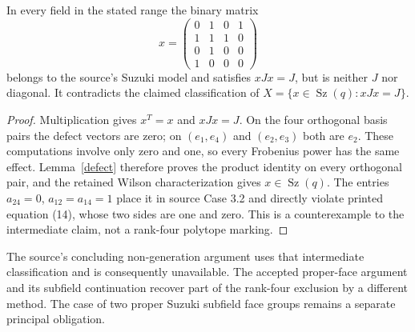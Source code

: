 \documentclass[11pt,a4paper]{article}
\begin{document}
\begin{proposition}
In every field in the stated range the binary matrix
\[
x=\begin{pmatrix}
0&1&0&1\\1&1&1&0\\0&1&0&0\\1&0&0&0
\end{pmatrix}
\]
belongs to the source's Suzuki model and satisfies $xJx=J$, but is
neither $J$ nor diagonal. It contradicts the claimed classification
of $X=\{x\in\operatorname{Sz}(q):xJx=J\}$.
\end{proposition}
\begin{proof}
Multiplication gives $x^T=x$ and $xJx=J$. On the four orthogonal
basis pairs the defect vectors are zero; on $(e_1,e_4)$ and
$(e_2,e_3)$ both are $e_2$. These computations involve only zero and
one, so every Frobenius power has the same effect. Lemma~\ref{defect}
therefore proves the product identity on every orthogonal pair, and
the retained Wilson characterization gives $x\in\operatorname{Sz}(q)$.
The entries $a_{24}=0$, $a_{12}=a_{14}=1$ place it in source Case 3.2
and directly violate printed equation (14), whose two sides are one
and zero. This is a counterexample to the intermediate claim, not a
rank-four polytope marking.
\end{proof}

The source's concluding non-generation argument uses that intermediate
classification and is consequently unavailable. The accepted proper-face
argument and its subfield continuation recover part of the rank-four
exclusion by a different method. The case of two proper Suzuki subfield
face groups remains a separate principal obligation.
\end{document}
